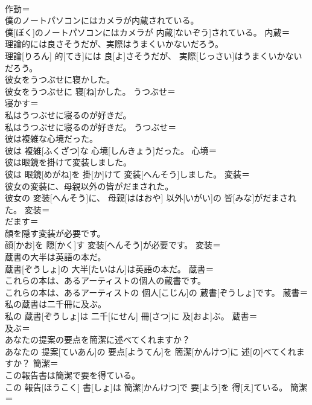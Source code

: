 \documentclass[8pt]{extreport}
\begin{document}
\begin{CJK}{UTF8}{min}
\\	作動＝ 
\\	僕のノートパソコンにはカメラが内蔵されている。	
\\	僕[ぼく]のノートパソコンにはカメラが 内蔵[ないぞう]されている。	内蔵＝ 
\\	理論的には良さそうだが、実際はうまくいかないだろう。	
\\	理論[りろん] 的[てき]には 良[よ]さそうだが、 実際[じっさい]はうまくいかないだろう。	
\\	彼女をうつぶせに寝かした。	
\\	彼女をうつぶせに 寝[ね]かした。	うつぶせ＝ 
\\	寝かす＝ 
\\	私はうつぶせに寝るのが好きだ。	
\\	私はうつぶせに寝るのが好きだ。	うつぶせ＝ 
\\	彼は複雑な心境だった。	
\\	彼は 複雑[ふくざつ]な 心境[しんきょう]だった。	心境＝ 
\\	彼は眼鏡を掛けて変装しました。	
\\	彼は 眼鏡[めがね]を 掛[か]けて 変装[へんそう]しました。	変装＝ 
\\	彼女の変装に、母親以外の皆がだまされた。	
\\	彼女の 変装[へんそう]に、 母親[ははおや] 以外[いがい]の 皆[みな]がだまされた。	変装＝ 
\\	だます＝ 
\\	顔を隠す変装が必要です。	
\\	顔[かお]を 隠[かく]す 変装[へんそう]が必要です。	変装＝ 
\\	蔵書の大半は英語の本だ。	
\\	蔵書[ぞうしょ]の 大半[たいはん]は英語の本だ。	蔵書＝ 
\\	これらの本は、あるアーティストの個人の蔵書です。	
\\	これらの本は、あるアーティストの 個人[こじん]の 蔵書[ぞうしょ]です。	蔵書＝ 
\\	私の蔵書は二千冊に及ぶ。	
\\	私の 蔵書[ぞうしょ]は 二千[にせん] 冊[さつ]に 及[およ]ぶ。	蔵書＝ 
\\	及ぶ＝ 
\\	あなたの提案の要点を簡潔に述べてくれますか？	
\\	あなたの 提案[ていあん]の 要点[ようてん]を 簡潔[かんけつ]に 述[の]べてくれますか？	簡潔＝ 
\\	この報告書は簡潔で要を得ている。	
\\	この 報告[ほうこく] 書[しょ]は 簡潔[かんけつ]で 要[よう]を 得[え]ている。	簡潔＝ 

\end{CJK}
\end{document}
